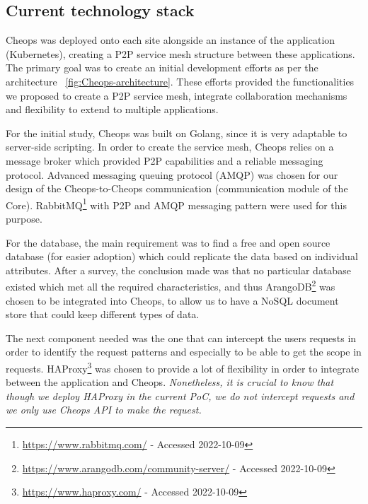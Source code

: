 %

\subsection{Current technology stack}


Cheops was deployed onto each site alongside an instance of the
application (Kubernetes), creating a \acrshort{P2P} service mesh
structure between these applications.
%
The primary goal was to create an initial development efforts as per
the architecture ~\autoref{fig:Cheops-architecture}.
%
These efforts provided the functionalities we proposed to create a P2P
service mesh, integrate collaboration mechanisms and flexibility to
extend to multiple applications.


For the initial study, Cheops was built on Golang, since it is very
adaptable to server-side scripting.
%
In order to create the service mesh, Cheops relies on a message broker
which provided P2P capabilities and a reliable messaging protocol.
%
Advanced messaging queuing protocol (AMQP) was chosen for our design of
the Cheops-to-Cheops communication (communication module of the Core).
%
RabbitMQ\footnote{\url{https://www.rabbitmq.com/} - Accessed
  2022-10-09} with P2P and AMQP messaging pattern were used for this
purpose.
%

For the database, the main requirement was to find a free and open
source database (for easier adoption) which could replicate the data
based on individual attributes.
%
After a survey, the conclusion made was that no particular database
existed which met all the required characteristics, and thus
ArangoDB\footnote{\url{https://www.arangodb.com/community-server/} -
  Accessed 2022-10-09} was chosen to be integrated into Cheops, to
allow us to have a NoSQL document store that could keep different
types of data.
%


The next component needed was the one that can intercept the users
requests in order to identify the request patterns and especially to
be able to get the scope in requests.
%
HAProxy\footnote{\url{https://www.haproxy.com/} - Accessed 2022-10-09}
was chosen to provide a lot of flexibility in order to integrate
between the application and Cheops.
%
\emph{Nonetheless, it is crucial to know that though we deploy HAProxy
in the current \acrshort{PoC}, we do not intercept requests and we
only use Cheops API to make the request.}


